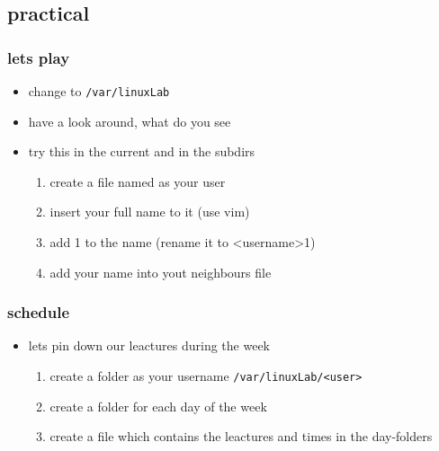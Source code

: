 \documentclass[hyperref={pdfpagelabels=false}]{beamer}
\newcommand{\code}[1]{\colorbox{lGray}{\texttt{#1}}}
\begin{document}
    \subsection{practical}
        \begin{frame}
			\frametitle{lets play}
			\begin{itemize}
                \item<1-> change to \code{/var/linuxLab}
                \item<2-> have a look around, what do you see
                \item<3-> try this in the current and in the subdirs
                \begin{enumerate}
                    \item<4-> create a file named as your user 
                    \item<4-> insert your full name to it (use vim)
                    \item<5-> add 1 to the name (rename it to \textless username\textgreater 1)
                    \item<6-> add your name into yout neighbours file
                \end{enumerate}
            \end{itemize}
		\end{frame}
        \begin{frame}
			\frametitle{schedule}
			\begin{itemize}
                \item<1-> lets pin down our leactures during the week
                \begin{enumerate}
                    \item<1-> create a folder as your username \code{/var/linuxLab/\textless user\textgreater}
                    \item<2-> create a folder for each day of the week
                    \item<3-> create a file which contains the leactures and times in the day-folders
                \end{enumerate}
            \end{itemize}
		\end{frame}
\end{document}
